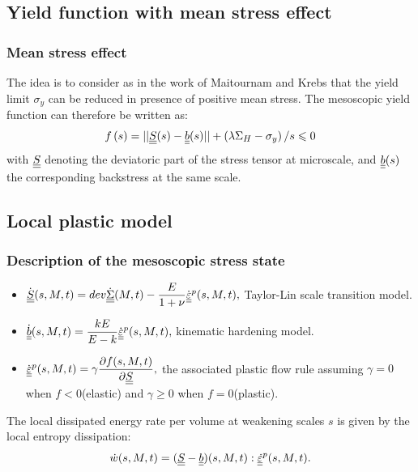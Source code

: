\documentclass[xcolor=table]{Bredelebeamer}
\begin{document}
\subsection{Yield function with mean stress effect}

\begin{frame}
	\frametitle{Mean stress effect}	
The idea is to consider as in the work of Maitournam and Krebs that the yield limit $\sigma_y$ can be reduced in presence of positive mean stress. The mesoscopic yield function can therefore be written as:
\begin{equation}
f\left(s\right)=||\uline{\uline{S}}(s)-\uline{\uline{b}}(s)||+\left( \lambda \Sigma_H-\sigma_y\right) /s\leqslant 0
\label{yieldfun}
\end{equation}
with $\uline{\uline{S}}$ denoting the deviatoric part of the stress tensor at microscale, and $\uline{\uline{b}}(s)$ the corresponding backstress at the same scale.
\end{frame}	

\subsection{Local plastic model}
\begin{frame}
	\frametitle{Description of the mesoscopic stress state}	

\begin{itemize}
	\item $\dot{\uline{\uline{S}}}(s,M,t)=dev\dot{\uline{\uline{\Sigma}}}(M,t)-\dfrac{E}{1+\nu}\dot{\uline{\uline{\varepsilon}}}^p(s,M,t),$ Taylor-Lin scale transition model.

	\vspace{6pt}	
	\item
	$\dot{\uline{\uline{b}}}(s,M,t)=\dfrac{kE}{E-k} \dot{\uline{\uline{\varepsilon}}}^p(s,M,t),$  kinematic hardening model.

	\vspace{6pt}	
		\item
		$\dot{\uline{\uline{\varepsilon}}}^p(s,M,t)=\gamma\dfrac{\partial f(s,M,t)}{\partial \uline{\uline{S}}}, $ the associated plastic flow rule assuming $\gamma=0$ when $f<0$(elastic) and  $\gamma\geqslant0$ when $f=0$(plastic).
\end{itemize}

	\vspace{6pt}
The local dissipated energy rate per volume at weakening scales $s$  is given by the local entropy dissipation:
$$\dot{w}(s,M,t)=(\uline{\uline{S}}-\uline{\uline{b}})(s,M,t):\uline{\uline{\dot{\varepsilon}}}^p(s,M,t).$$
\end{frame}
\end{document}
